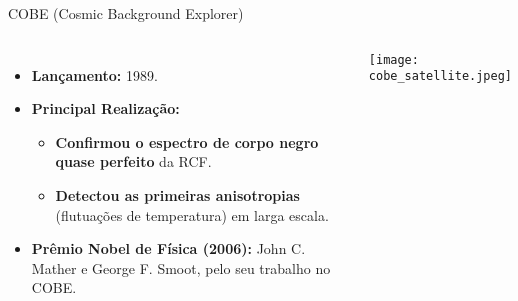 \documentclass{beamer}
\begin{document}
\begin{frame}{COBE (Cosmic Background Explorer)}
    \begin{columns}
        \begin{itemize}
            \item \textbf{Lançamento:} 1989.
            \item \textbf{Principal Realização:}
            \begin{itemize}
                \item \textbf{Confirmou o espectro de corpo negro quase perfeito} da RCF.
                \item \textbf{Detectou as primeiras anisotropias} (flutuações de temperatura) em larga escala.
            \end{itemize}
            \item \textbf{Prêmio Nobel de Física (2006):} John C. Mather e George F. Smoot, pelo seu trabalho no COBE.
        \end{itemize}
        \begin{center}
            \texttt{[image: cobe\_satellite.jpeg]} %

            \tiny
        \end{center}
    \end{columns}
\end{frame}
\end{document}
